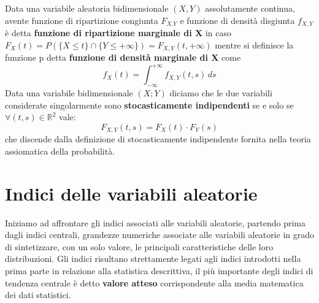 \documentclass[a4paper,12pt, oneside]{book}
\newcommand{\numberset}{\mathbb}
\newcommand{\R}{\numberset{R}}
\begin{document}
Data una variabile aleatoria bidimensionale $(X, Y)$ assolutamente continua, avente 
funzione di ripartizione congiunta $F_{X.Y}$ e funzione di densità disgiunta $f_{X,Y}$ è detta 
\textbf{funzione di ripartizione marginale di X} in caso $F_X(t) = P(\{X \leq t\} \cap \{Y \leq +\infty\}) 
                                                                 = F_{X, Y}(t, +\infty)$
mentre si definisce la funzione p detta \textbf{funzione di densità marginale di X} come
\[f_X(t) = \int_{-\infty}^{+\infty} f_{X, Y}(t, s)\,ds\]
Data una variabile bidimensionale $(X;Y)$ diciamo che le due variabili considerate singolarmente 
sono \textbf{stocasticamente indipendenti} se e solo se $\forall (t, s) \in \R^2$ vale:
\[F_{X, Y}(t, s) = F_X(t) \cdot F_Y(s)\]
che discende dalla definizione di stocasticamente indipendente fornita nella teoria assiomatica della probabilità.

\section{Indici delle variabili aleatorie}
Iniziamo ad affrontare gli indici associati alle variabili aleatorie, partendo prima dagli indici centrali,
grandezze numeriche associate alle variabili aleatorie in grado di sintetizzare, con un solo valore,
le principali caratteristiche delle loro distribuzioni.\newline
Gli indici risultano strettamente legati agli indici introdotti nella prima parte in relazione alla 
statistica descrittiva, il più importante degli indici di tendenza centrale è detto \textbf{valore atteso}
corrispondente alla media matematica dei dati statistici.
\end{document}
